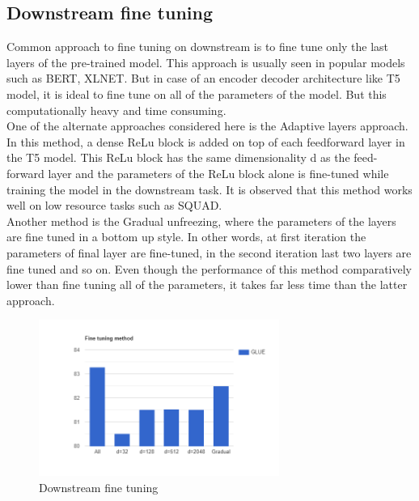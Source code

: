 \subsection{Downstream fine tuning}
Common approach to fine tuning on downstream is to fine tune only the last layers of the pre-trained model. This approach is usually seen in popular models such as BERT, XLNET. But in case of an encoder decoder architecture like T5 model, it is ideal to fine tune on all of the parameters of the model. But this computationally heavy and time consuming. \\
One of the alternate approaches considered here is the Adaptive layers approach. In this method, a dense ReLu block is added on top of each feedforward layer in the T5 model. This ReLu block has the same dimensionality d as the feed-forward layer and the parameters of the ReLu block alone is fine-tuned while training the model in the downstream task. It is observed that this method works well on low resource tasks such as SQUAD. \\
Another method is the Gradual unfreezing, where the parameters of the layers are fine tuned in a bottom up style. In other words, at first iteration the parameters of final layer are fine-tuned, in the second iteration last two layers are fine tuned and so on. Even though the performance of this method comparatively lower than fine tuning all of the parameters, it takes far less time than the latter approach. \\


\begin{figure}[H]
\centering
\includegraphics[width=0.7\textwidth]{images/finetune.png}
\caption{Downstream fine tuning}
\label{fig:finetune}
\end{figure}

